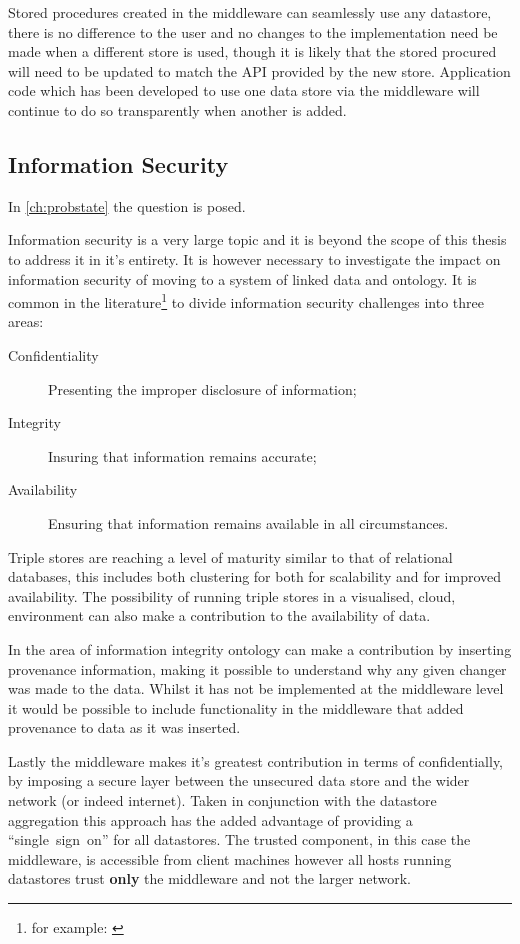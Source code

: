  Stored procedures created in the middleware can seamlessly use any datastore, there is no difference to the user and no changes to the implementation need be made when a different store is used, though it is likely that the stored procured will need to be updated to match the API provided by the new store. Application code which has been developed to use one data store via the middleware will continue to do so transparently when another is added. 

\subsection{Information Security}
In \autoref{ch:probstate} the question \say{\QuestionSecurity} is posed.

Information security is a very large topic and it is beyond the scope of this thesis to address it in it's entirety. It is however necessary to investigate the impact on information security of moving to a system of linked data and ontology.
It is common in the literature\footnote{for example: \citep{Erlingsson2016}} to divide information security challenges into three areas: 
\begin{description}
    \item[Confidentiality] Presenting the improper disclosure of information;
    \item[Integrity] Insuring that information remains accurate;
    \item[Availability] Ensuring that information remains available in all circumstances. 
\end{description}

Triple stores are reaching a level of maturity similar to that of relational databases, this includes both clustering for both for scalability and for improved availability. The possibility of running triple stores in a visualised, cloud, environment can also make a contribution to the availability of data. 

In the area of information integrity ontology can make a contribution by inserting provenance information, making it possible to understand why any given changer was made to the data. Whilst it has not be implemented at the middleware level it would be possible to include functionality in the middleware that added provenance to data as it was inserted. 

Lastly the middleware makes it's greatest contribution in terms of confidentially, by imposing a secure layer between the unsecured data store and the wider network (or indeed internet). Taken in conjunction with the datastore aggregation this approach has the added advantage of providing a ``single~sign~on'' for all datastores. The trusted component, in this case the middleware, is accessible from client machines however all hosts running datastores trust \textbf{only} the middleware and not the larger network. 


